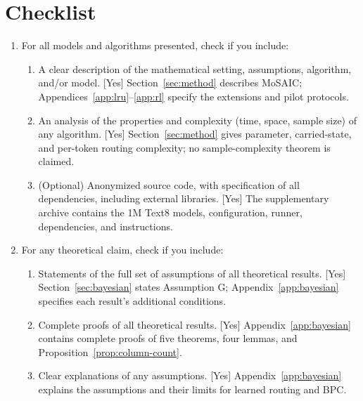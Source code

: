 \section*{Checklist}

\begin{enumerate}

  \item For all models and algorithms presented, check if you include:
  \begin{enumerate}
    \item A clear description of the mathematical setting, assumptions, algorithm, and/or model. [Yes] Section~\ref{sec:method} describes MoSAIC; Appendices~\ref{app:lru}--\ref{app:rl} specify the extensions and pilot protocols.
    \item An analysis of the properties and complexity (time, space, sample size) of any algorithm. [Yes] Section~\ref{sec:method} gives parameter, carried-state, and per-token routing complexity; no sample-complexity theorem is claimed.
    \item (Optional) Anonymized source code, with specification of all dependencies, including external libraries. [Yes] The supplementary archive contains the 1M Text8 models, configuration, runner, dependencies, and instructions.
  \end{enumerate}

  \item For any theoretical claim, check if you include:
  \begin{enumerate}
    \item Statements of the full set of assumptions of all theoretical results. [Yes] Section~\ref{sec:bayesian} states Assumption G; Appendix~\ref{app:bayesian} specifies each result's additional conditions.
    \item Complete proofs of all theoretical results. [Yes] Appendix~\ref{app:bayesian} contains complete proofs of five theorems, four lemmas, and Proposition~\ref{prop:column-count}.
    \item Clear explanations of any assumptions. [Yes] Appendix~\ref{app:bayesian} explains the assumptions and their limits for learned routing and BPC.
  \end{enumerate}


\end{enumerate}
